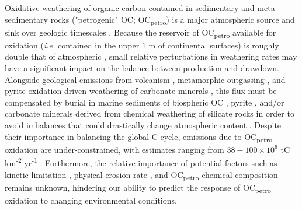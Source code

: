 Oxidative weathering of organic carbon contained in sedimentary and meta-sedimentary rocks ("petrogenic" OC; OC\textsubscript{petro}) is a major atmospheric  source and  sink over geologic timescales \citep[$\geq 10^{6}$ yr;][]{Berner:1989vr,Wildman:2004wf,Hayes:2006ca,Petsch:2014ct}. Because the reservoir of OC\textsubscript{petro} available for oxidation (\textit{i.e.} contained in the upper $1$ m of continental surfaces) is roughly double that of atmospheric  \citep{Copard:2007bf}, small relative perturbations in weathering rates may have a significant impact on the balance between  production and drawdown. Alongside geological  emissions from volcanism \citep{Marty:1998vo}, metamorphic outgassing \citep{Becker:2008bd}, and pyrite oxidation-driven weathering of carbonate minerals \citep{Torres:2014cx}, this flux must be compensated by burial in marine sediments of biospheric OC \citep[OC\textsubscript{bio};][]{FranceLanord:1997ua,Galy:2007ev,Hilton:2008fo}, pyrite \citep{Berner:1989vr,Hayes:2006ca}, and/or carbonate minerals derived from chemical weathering of silicate rocks \citep{Berner:1989vr} in order to avoid imbalances that could drastically change atmospheric  content \citep{Berner:1997df}. Despite their importance in balancing the global C cycle,  emissions due to OC\textsubscript{petro} oxidation are under-constrained, with estimates ranging from $38 - 100 \times 10^{6}$ tC km\textsuperscript{-2} yr\textsuperscript{-1} \citep{Petsch:2014ct}. Furthermore, the relative importance of potential factors such as kinetic limitation \citep{Chang:1999vo,Petsch:2001eq}, physical erosion rate \citep{Hilton:2014dh}, and OC\textsubscript{petro} chemical composition \citep{Galy:2008ff} remains unknown, hindering our ability to predict the response of OC\textsubscript{petro} oxidation to changing environmental conditions.

